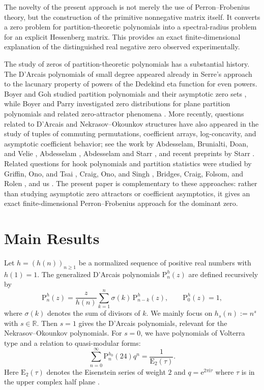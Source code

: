 \documentclass[11pt,reqno]{amsart}
\theoremstyle{plain}
\theoremstyle{remark}
\theoremstyle{definition}
\numberwithin{equation}{section}
\newcommand{\eisenst}{\mathrm{E}}
\newcommand{\pol}{\mathrm{P}}
\begin{document}
The novelty of the present approach is not merely the use of Perron--Frobenius theory, but the construction of the primitive nonnegative matrix itself. It converts a zero problem for partition-theoretic polynomials into a spectral-radius problem for an explicit Hessenberg matrix. This provides an exact finite-dimensional explanation of the distinguished real negative zero observed experimentally.






The study of zeros of partition-theoretic polynomials has a substantial history.
The D'Arcais polynomials of small degree appeared already in Serre's approach
\cite{Se85} to the lacunary property of powers of the Dedekind eta function for even powers.
Boyer and Goh studied partition polynomials and their asymptotic zero sets
\cite{BG08}, while Boyer and Parry investigated zero distributions for plane
partition polynomials and related zero-attractor phenomena \cite{BoPa12,BoPa21}.
More recently, questions related to D'Arcais and Nekrasov--Okounkov structures
have also appeared in the study of tuples of commuting permutations, coefficient
arrays, log-concavity, and asymptotic coefficient behavior; see the work by
Abdesselam, Brunialti, Doan, and Velie \cite{ABDV24}, Abdesselam \cite{Ab25},
Abdesselam and Starr \cite{AS26}, and recent preprints by Starr
\cite{St26a,St26b}. Related questions for hook polynomials and partition
statistics were studied by
Griffin, Ono, and Tsai \cite{GOT24},
Craig, Ono, and
Singh \cite{COS25},
Bridges, Craig, Folsom, and Rolen \cite{BCFR25},
and us \cite{HN19}.
The present paper is complementary to these approaches: rather than studying
asymptotic zero attractors or coefficient asymptotics, it gives an exact
finite-dimensional Perron--Frobenius approach for the dominant zero.


\section{Main Results}

Let $h=(h(n))_{n\ge1}$ be a normalized sequence of positive real numbers with $h(1)=1$.
The generalized D'Arcais polynomials $\pol _n^h(z)$ \cite{HNT20} are defined recursively by
\[
\pol _n^h(z)
=
\frac{z}{h(n)}
\sum_{k=1}^n
\sigma(k)\,\pol _{n-k}^h(z),
\qquad
\pol _0^h(z)=1,
\]
where $\sigma(k)$ denotes the sum of divisors of $k$. 
We mainly focus on
$h_s(n):=n^s$ with $s \in \mathbb{R}$. Then $s=1$ gives the D'Arcais polynomials, relevant for the Nekrasov--Okounkov polynomials.  For $s=0$, we have polynomials of Volterra type and a relation to quasi-modular forms: $$\sum_{n=0}^{\infty} \pol _n^{h_0}(24) q^n =\frac{1}{\eisenst _2(\tau)}.$$
Here $\eisenst _2(\tau)$ denotes the Eisenstein series of weight $2$ and $q=\mathrm{e}^{ 2 \pi \mathrm{i} \tau}$ where $\tau$ is in the upper complex
half plane \cite{On04, HN24}.
\end{document}
